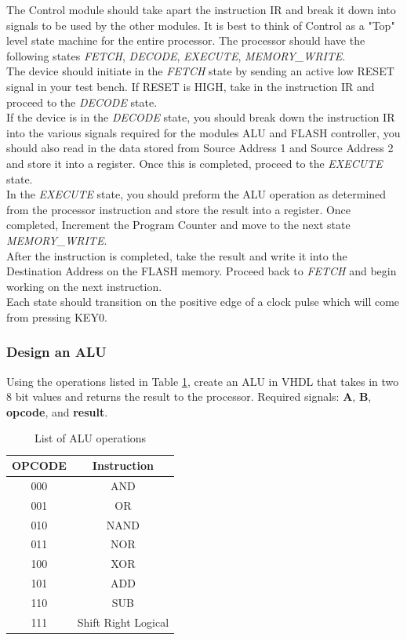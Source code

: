 The Control module should take apart the instruction IR and break it down into signals to be used by the other modules. It is best to think of Control as a "Top" level state machine for the entire processor. The processor should have the following states \emph{FETCH}, \emph{DECODE}, \emph{EXECUTE}, \emph{MEMORY\_WRITE}. \\ 

The device should initiate in the \emph{FETCH} state by sending an active low RESET signal in your test bench. If RESET is HIGH, take in the instruction IR and proceed to the \emph{DECODE} state. \\

If the device is in the \emph{DECODE} state, you should break down the instruction IR into the various signals required for the modules ALU and FLASH controller, you should also read in the data stored from Source Address 1 and Source Address 2 and store it into a register. Once this is completed,  proceed to the \emph{EXECUTE} state. \\

In the \emph{EXECUTE} state, you should preform the ALU operation as determined from the processor instruction and store the result into a register. Once completed, Increment the Program Counter and move to the next state \emph{MEMORY\_WRITE}. \\

After the instruction is completed, take the result and write it into the Destination Address on the FLASH memory. Proceed back to \emph{FETCH} and begin working on the next instruction. \\

Each state should transition on the positive edge of a clock pulse which will come from pressing KEY0.

\subsubsection{Design an ALU}
Using the operations listed in Table \ref{tab:aluop}, create an ALU in VHDL that takes in two 8 bit values and returns the result to the processor. Required signals: {\bf A}, {\bf B}, {\bf opcode}, and {\bf result}.

\begin {table}[H]
	\caption {List of ALU operations} 
	\label{tab:aluop} 
	\begin{center}
    		\begin{tabular}{ | c | c |}
			\hline
 			{\bf OPCODE} & {\bf Instruction} \\ \hline
			000 & AND \\ \hline
			001 & OR \\ \hline
			010 & NAND \\ \hline
			011 & NOR \\ \hline
			100 & XOR \\ \hline
			101 & ADD \\ \hline
			110 & SUB \\ \hline
			111 & Shift Right Logical \\
			\hline
    		\end{tabular}
	\end{center}
\end{table}

